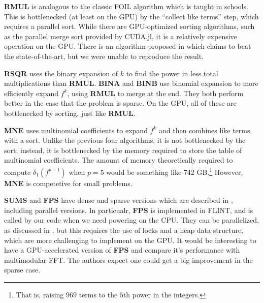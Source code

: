 \textbf{RMUL} is analogous to the classic FOIL algorithm which is taught in schools. 
This is bottlenecked (at least on the GPU) by the ``collect like terms'' step, 
which requires a parallel sort.
While there are GPU-optimized sorting algorithms, such as the parallel merge sort
provided by CUDA.jl, it is a relatively expensive operation on the GPU.
There is an algorithm proposed in \cite{gupta-2023-gpu-sort}
which claims to beat the state-of-the-art, but we were unable to reproduce the result.

\textbf{RSQR} uses the binary expansion of \(k\) to find the power in less
total multiplications than \textbf{RMUL}.
\textbf{BINA} and \textbf{BINB} use binomial expansion to more efficiently 
expand \(f^{k}\), using \textbf{RMUL} to merge at the end.
They both perform better in the case that the problem is sparse.
On the GPU, all of these are bottlenecked by sorting, just like
\textbf{RMUL}.

\textbf{MNE} uses multinomial coefficients to expand \(f^{k}\) 
and then combines like terms with a sort. 
Unlike the previous four algorithms, it is not bottlenecked by the sort;
instead, it is bottlenecked by the memory required to store the table of
multinomial coefficients. 
The amount of memory theoretically required to compute 
$\delta_1(f ^ {p - 1})$ when \(p=5\) 
would be something like 742 GB.\footnote{
	That is, raising 
    $969$ terms to the $5$th power
	in the integers.
}
However, \textbf{MNE} is competetive for small problems.

\textbf{SUMS} and \textbf{FPS} have dense and sparse versions which are described in 
\cite{monagan-2012-sparse-powering}, including parallel versions.
In particualr, \textbf{FPS} is implemented in FLINT, and is called by our
code when we need powering on the CPU.
They can be parallelized, as discussed in \cite{monagan-2012-sparse-powering},
but this requires the use of locks and a heap data structure,
which are more challenging to implement on the GPU.
It would be interesting to have a GPU-accelerated version of
\textbf{FPS} and compare it's performance with 
multimodular FFT.
The authors expect one could get a big improvement in the sparse case.




